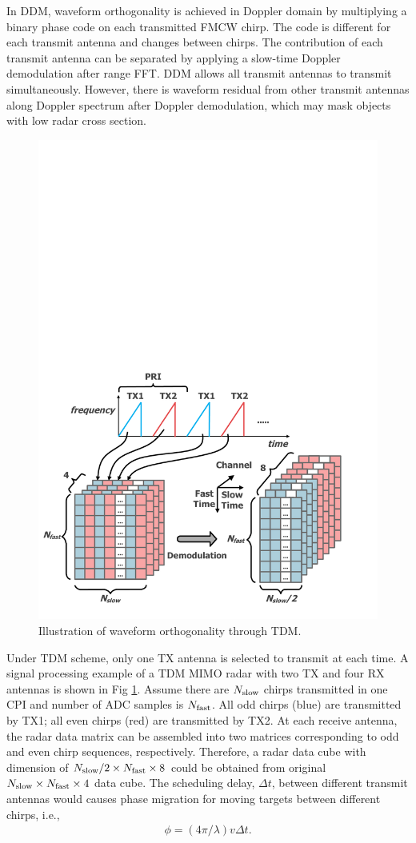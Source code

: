 \documentclass[conference]{IEEEtran}
\begin{document}
In DDM, waveform orthogonality is achieved in Doppler domain by multiplying a binary phase code on each transmitted FMCW chirp. The code is different for each transmit antenna and changes between chirps. The contribution of each transmit antenna can be separated by applying a slow-time Doppler demodulation after range FFT. DDM allows all transmit antennas to transmit simultaneously. However, there is waveform residual from other transmit antennas along Doppler spectrum after Doppler demodulation, which may mask objects with low radar cross section. 


\vspace{-3mm}
\begin{figure}[h]
\centering
\includegraphics[width=2.2 in]{pic/virtual_array.pdf}
\caption{\label{fig_TDM} Illustration of waveform orthogonality through TDM.} 
\end{figure}
\vspace{-2mm}
Under TDM scheme, only one TX antenna is selected to transmit at each time. A signal processing example of a TDM MIMO radar with two TX and four RX antennas is shown in Fig \ref{fig_TDM}. Assume there are $N_{\rm slow}$ chirps transmitted in one CPI and number of ADC samples is $N_{\rm fast}$. All odd chirps (blue) are  transmitted by TX1; all even chirps (red) are transmitted by TX2. At each receive antenna, 
the radar data matrix can be assembled into two matrices corresponding to odd and even chirp sequences, respectively. Therefore, a radar data cube with dimension of $N_{\rm slow}/2 \times N_{\rm fast} \times 8 $  could be obtained from original $N_{\rm slow} \times N_{\rm fast} \times 4 $ data cube.
The scheduling delay, $\Delta t$, between different transmit antennas would causes phase migration for moving targets between different chirps, i.e.,
\begin{align}
 \phi = (4 \pi / \lambda)v\Delta t.   \label{eq_vel_phase_migration}
\end{align}
\end{document}
